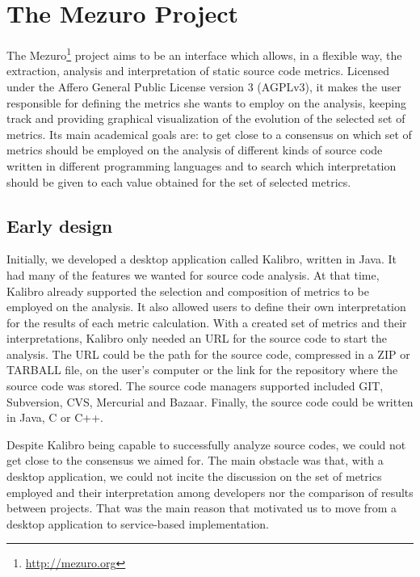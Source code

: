 \newpage
\section{The Mezuro Project}
\label{sec:mezuro}

The Mezuro\footnote{\url{http://mezuro.org}} project aims to be an interface which allows, in a flexible way, the extraction, analysis and interpretation of static source code metrics. Licensed under the Affero General Public License version 3 (AGPLv3), it makes the user responsible for defining the metrics she wants to employ on the analysis, keeping track and providing graphical visualization of the evolution of the selected set of metrics. Its main academical goals are: to get close to a consensus on which set of metrics should be employed on the analysis of different kinds of source code written in different programming languages and to search which interpretation should be given to each value obtained for the set of selected metrics.

\subsection{Early design}
\label{subsec:early-design}

Initially, we developed a desktop application called Kalibro, written in Java. It had many of the features we wanted for source code analysis. At that time, Kalibro already supported the selection and composition of metrics to be employed on the analysis. It also allowed users to define their own interpretation for the results of each metric calculation. With a created set of metrics and their interpretations, Kalibro only needed an URL for the source code to start the analysis. The URL could be the path for the source code, compressed in a ZIP or TARBALL file, on the user's computer or the link for the repository where the source code was stored. The source code managers supported included GIT, Subversion, CVS, Mercurial and Bazaar. Finally, the source code could be written in Java, C or C++.

Despite Kalibro being capable to successfully analyze source codes, we could not get close to the consensus we aimed for. The main obstacle was that, with a desktop application, we could not incite the discussion on the set of metrics employed and their interpretation among developers nor the comparison of results between projects. That was the main reason that motivated us to move from a desktop application to service-based implementation.

